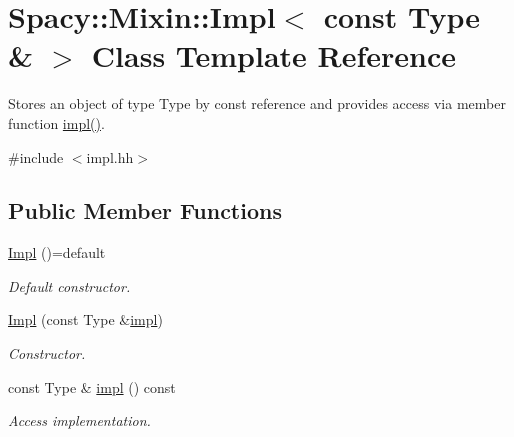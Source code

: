 \hypertarget{classSpacy_1_1Mixin_1_1Impl_3_01const_01Type_01_6_01_4}{}\section{Spacy\+:\+:Mixin\+:\+:Impl$<$ const Type \& $>$ Class Template Reference}
\label{classSpacy_1_1Mixin_1_1Impl_3_01const_01Type_01_6_01_4}


Stores an object of type Type by const reference and provides access via member function \hyperlink{classSpacy_1_1Mixin_1_1Impl_3_01const_01Type_01_6_01_4_a5999a2a31217f4d4e5a0354f0bd14f66}{impl()}.  




{\ttfamily \#include $<$impl.\+hh$>$}

\subsection*{Public Member Functions}
\begin{DoxyCompactItemize}
\item 
\hypertarget{classSpacy_1_1Mixin_1_1Impl_3_01const_01Type_01_6_01_4_a0d9405574d5ec265ece2833b2d88b9f1}{}\hyperlink{classSpacy_1_1Mixin_1_1Impl_3_01const_01Type_01_6_01_4_a0d9405574d5ec265ece2833b2d88b9f1}{Impl} ()=default\label{classSpacy_1_1Mixin_1_1Impl_3_01const_01Type_01_6_01_4_a0d9405574d5ec265ece2833b2d88b9f1}

\begin{DoxyCompactList}\small\item\em Default constructor. \end{DoxyCompactList}\item 
\hyperlink{classSpacy_1_1Mixin_1_1Impl_3_01const_01Type_01_6_01_4_ac6651e57f54fe92960212cde6f83fcfd_ac6651e57f54fe92960212cde6f83fcfd}{Impl} (const Type \&\hyperlink{classSpacy_1_1Mixin_1_1Impl_3_01const_01Type_01_6_01_4_a5999a2a31217f4d4e5a0354f0bd14f66}{impl})
\begin{DoxyCompactList}\small\item\em Constructor. \end{DoxyCompactList}\item 
\hypertarget{classSpacy_1_1Mixin_1_1Impl_3_01const_01Type_01_6_01_4_a5999a2a31217f4d4e5a0354f0bd14f66}{}const Type \& \hyperlink{classSpacy_1_1Mixin_1_1Impl_3_01const_01Type_01_6_01_4_a5999a2a31217f4d4e5a0354f0bd14f66}{impl} () const \label{classSpacy_1_1Mixin_1_1Impl_3_01const_01Type_01_6_01_4_a5999a2a31217f4d4e5a0354f0bd14f66}

\begin{DoxyCompactList}\small\item\em Access implementation. \end{DoxyCompactList}\end{DoxyCompactItemize}


